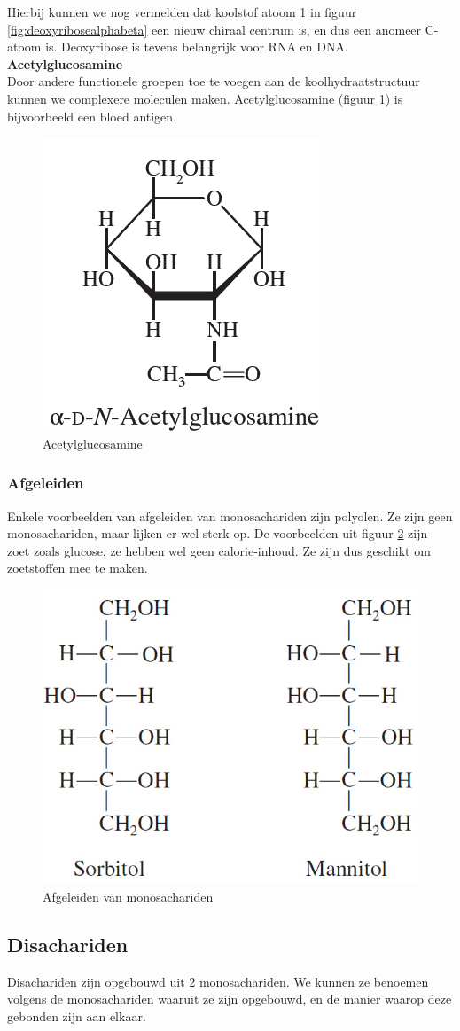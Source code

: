 \documentclass[a4paper,kul]{kulakarticle} %
\begin{document}
Hierbij kunnen we nog vermelden dat koolstof atoom 1 in figuur \ref{fig:deoxyribosealphabeta} een nieuw chiraal centrum is, en dus een anomeer C-atoom is. Deoxyribose is tevens belangrijk voor RNA en DNA.\\
\textbf{Acetylglucosamine}\\
Door andere functionele groepen toe te voegen aan de koolhydraatstructuur kunnen we complexere moleculen maken. Acetylglucosamine (figuur \ref{fig:acetylglucosamine}) is bijvoorbeeld een bloed antigen.
\begin{figure}[h]
	\centering
	\includegraphics[width=0.4\linewidth]{Acetylglucosamine}
	\caption[Acetylglucosamine]{Acetylglucosamine}
	\label{fig:acetylglucosamine}
\end{figure}
\subsubsection{Afgeleiden}
Enkele voorbeelden van afgeleiden van monosachariden zijn polyolen. Ze zijn geen monosachariden, maar lijken er wel sterk op. De voorbeelden uit figuur \ref{fig:afgeleidenmonosachariden} zijn zoet zoals glucose, ze hebben wel geen calorie-inhoud. Ze zijn dus geschikt om zoetstoffen mee te maken.
\begin{figure}[h]
	\centering
	\includegraphics[width=0.4\linewidth]{AfgeleidenMonosachariden}
	\caption[Afgeleiden]{Afgeleiden van monosachariden}
	\label{fig:afgeleidenmonosachariden}
\end{figure}

\subsection{Disachariden}
Disachariden zijn opgebouwd uit 2 monosachariden. We kunnen ze benoemen volgens de monosachariden waaruit ze zijn opgebouwd, en de manier waarop deze gebonden zijn aan elkaar.
\end{document}
